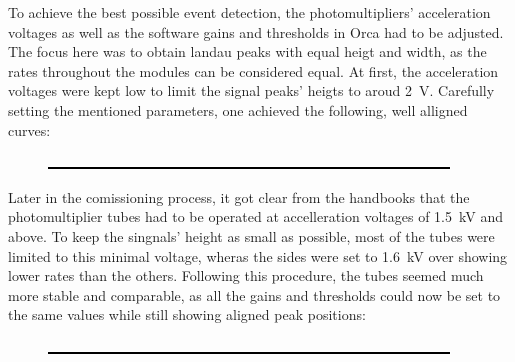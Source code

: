%

To achieve the best possible event detection, the photomultipliers' acceleration voltages as well as the software gains and thresholds in Orca had to be adjusted.
The focus here was to obtain landau peaks with equal heigt and width, as the rates throughout the modules can be considered equal.
At first, the acceleration voltages were kept low to limit the signal peaks' heigts to aroud \SI{2}{\volt}. Carefully setting the mentioned parameters, one achieved the following, well alligned curves:

\begin{figure}
	\centering
	\includegraphics[width = 0.5 \textwidth]{graphics/dummy.eps}
\end{figure}

Later in the comissioning process, it got clear from the handbooks that the photomultiplier tubes had to be operated at accelleration voltages of \SI{1.5}{\kilo\volt} and above. To keep the singnals' height as small as possible, most of the tubes were limited to this minimal voltage, wheras the sides  were set to \SI{1.6}{\kilo\volt} over showing lower rates than the others. Following this procedure, the tubes seemed much more stable and comparable, as all the gains and thresholds could now be set to the same values while still showing aligned peak positions:

\begin{figure}
	\centering
	\includegraphics[width = 0.5 \textwidth]{graphics/dummy.eps}
\end{figure}


